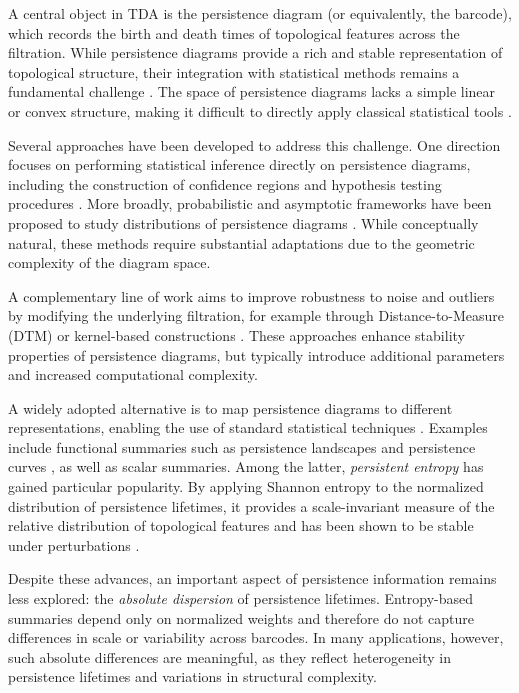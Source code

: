 \documentclass[11pt]{amsart}
\theoremstyle{definition}
\begin{document}
A central object in TDA is the persistence diagram (or equivalently, the barcode), which records the birth and death times of topological features across the filtration. While persistence diagrams provide a rich and stable representation of topological structure, their integration with statistical methods remains a fundamental challenge \cite{cohen-steiner_stability_2007}. The space of persistence diagrams lacks a simple linear or convex structure, making it difficult to directly apply classical statistical tools \cite{Mileyko_2011}.

Several approaches have been developed to address this challenge. One direction focuses on performing statistical inference directly on persistence diagrams, including the construction of confidence regions and hypothesis testing procedures \cite{fasy_confidence_2014, robinson_hypothesis_2017}. More broadly, probabilistic and asymptotic frameworks have been proposed to study distributions of persistence diagrams \cite{mileyko_probability_2011, hiraoka_limit_2018}. While conceptually natural, these methods require substantial adaptations due to the geometric complexity of the diagram space.

A complementary line of work aims to improve robustness to noise and outliers by modifying the underlying filtration, for example through Distance-to-Measure (DTM) or kernel-based constructions \cite{chazal_robust_2018, anai_dtm-based_2020}. These approaches enhance stability properties of persistence diagrams, but typically introduce additional parameters and increased computational complexity.

A widely adopted alternative is to map persistence diagrams to different representations, enabling the use of standard statistical techniques \cite{ali_survey_2023}. Examples include functional summaries such as persistence landscapes \cite{bubenik_statistical_2015} and persistence curves \cite{chung_persistence_2022}, as well as scalar summaries. Among the latter, \emph{persistent entropy} \cite{rucco_characterisation_2016} has gained particular popularity. By applying Shannon entropy to the normalized distribution of persistence lifetimes, it provides a scale-invariant measure of the relative distribution of topological features and has been shown to be stable under perturbations \cite{atienza_persistent_2019, atienza_stability_2020}.

Despite these advances, an important aspect of persistence information remains less explored: the \emph{absolute dispersion} of persistence lifetimes. Entropy-based summaries depend only on normalized weights and therefore do not capture differences in scale or variability across barcodes. In many applications, however, such absolute differences are meaningful, as they reflect heterogeneity in persistence lifetimes and variations in structural complexity.
\end{document}
